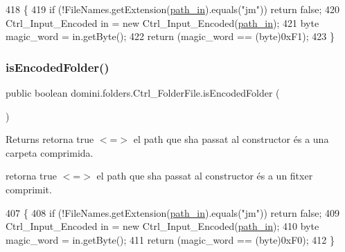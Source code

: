 \begin{DoxyCode}
418                                    \{
419         \textcolor{keywordflow}{if} (!FileNames.getExtension(\hyperlink{classdomini_1_1folders_1_1Ctrl__FolderFile_a0d3946bb2832a1f34d0c2227df5c71c4}{path\_in}).equals(\textcolor{stringliteral}{"jm"})) \textcolor{keywordflow}{return} \textcolor{keyword}{false};
420         Ctrl\_Input\_Encoded in = \textcolor{keyword}{new} Ctrl\_Input\_Encoded(\hyperlink{classdomini_1_1folders_1_1Ctrl__FolderFile_a0d3946bb2832a1f34d0c2227df5c71c4}{path\_in});
421         byte magic\_word = in.getByte();
422         \textcolor{keywordflow}{return} (magic\_word == (byte)0xF1);
423     \}
\end{DoxyCode}
\mbox{\label{classdomini_1_1folders_1_1Ctrl__FolderFile_a095e6037e5cdf9a43806a308ca028791}} 
\subsubsection{\texorpdfstring{is\+Encoded\+Folder()}{isEncodedFolder()}}
{\footnotesize\ttfamily public boolean domini.\+folders.\+Ctrl\+\_\+\+Folder\+File.\+is\+Encoded\+Folder (\begin{DoxyParamCaption}{ }\end{DoxyParamCaption})\hspace{0.3cm}{\ttfamily [inline]}}

\begin{DoxyReturn}{Returns}
retorna true $<$=$>$ el path que s\textquotesingle{}ha passat al constructor és a una carpeta comprimida.

retorna true $<$=$>$ el path que s\textquotesingle{}ha passat al constructor és a un fitxer comprimit. 
\end{DoxyReturn}

\begin{DoxyCode}
407                                      \{
408         \textcolor{keywordflow}{if} (!FileNames.getExtension(\hyperlink{classdomini_1_1folders_1_1Ctrl__FolderFile_a0d3946bb2832a1f34d0c2227df5c71c4}{path\_in}).equals(\textcolor{stringliteral}{"jm"})) \textcolor{keywordflow}{return} \textcolor{keyword}{false};
409         Ctrl\_Input\_Encoded in = \textcolor{keyword}{new} Ctrl\_Input\_Encoded(\hyperlink{classdomini_1_1folders_1_1Ctrl__FolderFile_a0d3946bb2832a1f34d0c2227df5c71c4}{path\_in});
410         byte magic\_word = in.getByte();
411         \textcolor{keywordflow}{return} (magic\_word == (byte)0xF0);
412     \}
\end{DoxyCode}


